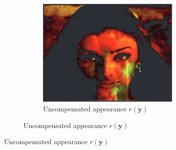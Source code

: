 \begin{figure}
\begin{subfigure}{0.9\textwidth}
\begin{subfigure}{0.24\textwidth}
        \end{subfigure}
        \hfill
        \begin{subfigure}{0.34\textwidth}
            \centering
            \includegraphics[width=\textwidth]{images/01-grossberg-uncompensated.jpg}
            \caption{Uncompensated appearance \(r(\bm{y})\)}
            \label{fig:intro_grossberg-uncompensated}
        \end{subfigure}
        

\end{subfigure}
\end{figure}
